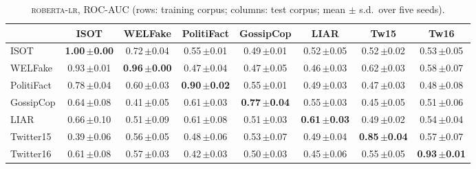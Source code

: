 \begin{table}[h]
\centering
\caption{\textsc{roberta-lr}, ROC-AUC (rows: training corpus; columns: test corpus; mean $\pm$ s.d.\ over five seeds).}
\scriptsize
\begin{tabular}{@{}lccccccc@{}}
\toprule
 & ISOT & WELFake & PolitiFact & GossipCop & LIAR & Tw15 & Tw16 \\
\midrule
ISOT & \textbf{1.00\,{\tiny$\pm$0.00}} & 0.72\,{\tiny$\pm$0.04} & 0.55\,{\tiny$\pm$0.01} & 0.49\,{\tiny$\pm$0.01} & 0.52\,{\tiny$\pm$0.05} & 0.52\,{\tiny$\pm$0.02} & 0.53\,{\tiny$\pm$0.05} \\
WELFake & 0.93\,{\tiny$\pm$0.01} & \textbf{0.96\,{\tiny$\pm$0.00}} & 0.47\,{\tiny$\pm$0.04} & 0.47\,{\tiny$\pm$0.05} & 0.46\,{\tiny$\pm$0.03} & 0.62\,{\tiny$\pm$0.03} & 0.58\,{\tiny$\pm$0.07} \\
PolitiFact & 0.78\,{\tiny$\pm$0.04} & 0.60\,{\tiny$\pm$0.03} & \textbf{0.90\,{\tiny$\pm$0.02}} & 0.55\,{\tiny$\pm$0.01} & 0.49\,{\tiny$\pm$0.03} & 0.47\,{\tiny$\pm$0.03} & 0.48\,{\tiny$\pm$0.08} \\
GossipCop & 0.64\,{\tiny$\pm$0.08} & 0.41\,{\tiny$\pm$0.05} & 0.61\,{\tiny$\pm$0.03} & \textbf{0.77\,{\tiny$\pm$0.04}} & 0.55\,{\tiny$\pm$0.03} & 0.45\,{\tiny$\pm$0.05} & 0.51\,{\tiny$\pm$0.06} \\
LIAR & 0.66\,{\tiny$\pm$0.10} & 0.51\,{\tiny$\pm$0.09} & 0.61\,{\tiny$\pm$0.08} & 0.51\,{\tiny$\pm$0.03} & \textbf{0.61\,{\tiny$\pm$0.03}} & 0.49\,{\tiny$\pm$0.02} & 0.54\,{\tiny$\pm$0.04} \\
Twitter15 & 0.39\,{\tiny$\pm$0.06} & 0.56\,{\tiny$\pm$0.05} & 0.48\,{\tiny$\pm$0.06} & 0.53\,{\tiny$\pm$0.07} & 0.49\,{\tiny$\pm$0.04} & \textbf{0.85\,{\tiny$\pm$0.04}} & 0.57\,{\tiny$\pm$0.07} \\
Twitter16 & 0.61\,{\tiny$\pm$0.08} & 0.57\,{\tiny$\pm$0.03} & 0.42\,{\tiny$\pm$0.03} & 0.50\,{\tiny$\pm$0.03} & 0.45\,{\tiny$\pm$0.06} & 0.55\,{\tiny$\pm$0.05} & \textbf{0.93\,{\tiny$\pm$0.01}} \\
\bottomrule
\end{tabular}
\end{table}

